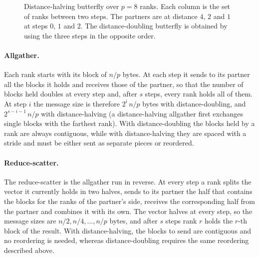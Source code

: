 \begin{figure}[t]
  \centering
  \caption{Distance-halving butterfly over $p=8$ ranks. Each column is the set of ranks between two steps. The partners are at distance $4$, $2$ and $1$ at steps $0$, $1$ and $2$. The distance-doubling butterfly is obtained by using the three steps in the opposite order.}
  \label{fig:bg-butterfly}
\end{figure}

\paragraph{Allgather.}
Each rank starts with its block of $n/p$ bytes.
At each step it sends to its partner all the blocks it holds and receives those of the partner, so that the number of blocks held doubles at every step and, after $s$ steps, every rank holds all of them.
At step $i$ the message size is therefore $2^{i}\,n/p$ bytes with distance-doubling, and $2^{s-i-1}\,n/p$ with distance-halving (a distance-halving allgather first exchanges single blocks with the farthest rank).
With distance-doubling the blocks held by a rank are always contiguous, while with distance-halving they are spaced with a stride and must be either sent as separate pieces or reordered.

\paragraph{Reduce-scatter.}
The reduce-scatter is the allgather run in reverse.
At every step a rank splits the vector it currently holds in two halves, sends to its partner the half that contains the blocks for the ranks of the partner's side, receives the corresponding half from the partner and combines it with its own.
The vector halves at every step, so the message sizes are $n/2,n/4,\dots,n/p$ bytes, and after $s$ steps rank $r$ holds the $r$-th block of the result.
With distance-halving, the blocks to send are contiguous and no reordering is needed, whereas distance-doubling requires the same reordering described above.

